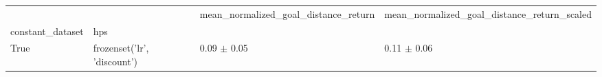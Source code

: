 \begin{tabular}{llll}
\toprule
 &  & mean_normalized_goal_distance_return & mean_normalized_goal_distance_return_scaled \\
constant_dataset & hps &  &  \\
\midrule
True & frozenset({'lr', 'discount'}) & 0.09 $\pm$ 0.05 & 0.11 $\pm$ 0.06 \\
\cline{1-4}
\bottomrule
\end{tabular}
